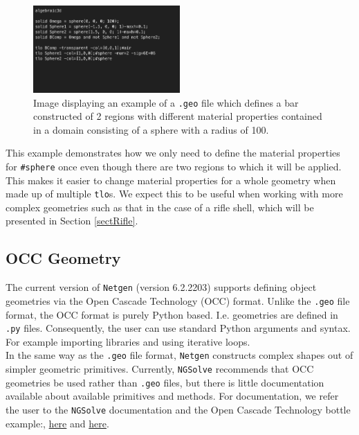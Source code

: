 \begin{figure}[H]
\begin{center}
\includegraphics[width=0.5\textwidth]{Figures/TwoSpheresExample.png}
\caption{Image displaying an example of a \texttt{.geo} file which defines a bar constructed of 2 regions with different material properties contained in a domain consisting of a sphere with a radius of 100.}\label{fig:TwoSpheresExample}
\end{center}
\end{figure}
\noindent
This example demonstrates how we only need to define the material properties for \texttt{\#sphere} once even though there are two regions to which it will be applied. This makes it easier to change material properties for a whole geometry when made up of multiple \texttt{tlo}s. We expect this to be useful when working with more complex geometries such as that in the case of a rifle shell, which will be presented in Section \ref{sectRifle}.


\subsection{OCC Geometry}
The current version of \texttt{Netgen} (version 6.2.2203) supports defining object geometries via the Open Cascade Technology (OCC) format. Unlike the \texttt{.geo} file format, the OCC format is purely Python based. I.e. geometries are defined in \texttt{.py} files. Consequently, the user can use standard Python arguments and syntax. For example importing libraries and using iterative loops.\\

\noindent
In the same way as the \texttt{.geo} file format, \texttt{Netgen} constructs complex shapes out of simpler geometric primitives. Currently, \texttt{NGSolve} recommends that OCC geometries be used rather than \texttt{.𝚐𝚎𝚘} files, but there is little documentation available about available primitives and methods. For documentation, we refer the user to the \texttt{NGSolve} documentation and the Open Cascade Technology bottle example:, \href{https://docu.ngsolve.org/latest/i-tutorials/unit-4.4-occ/occ.html?highlight=occ}{here} and \href{https://dev.opencascade.org/doc/overview/html/occt__tutorial.html}{here}.\\

